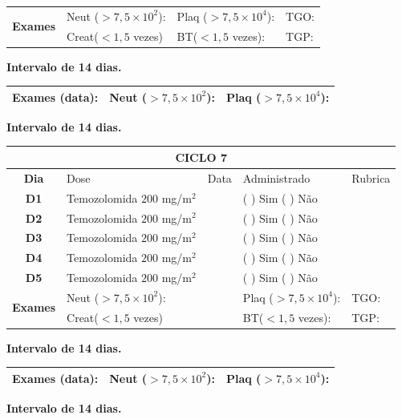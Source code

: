 \documentclass[11pt,a4paper,oldfontcommands]{memoir}
\begin{document}
\begin{center}
\begin{table}[H]
\begin{tabular}{p{1cm}p{5cm}|p{1cm}|p{4.5cm}|p{2cm}}
    \hline
    \multicolumn{1}{c|}{\multirow{2}{*}{\textbf{Exames}}}&\multicolumn{2}{l|}{Neut (\(>7,5\times10^2\)):}&{Plaq (\(>7,5\times10^4\)):}&{TGO:}\\
    \cline{2-5}
    \multicolumn{1}{c|}{\multirow{2}{*}{{}}}&\multicolumn{2}{l|}{Creat(\(<1,5\) vezes)}&{BT(\(<1,5\) vezes):}&{TGP:}
    \\
    \hline
\end{tabular}
\end{table}
\textbf{Intervalo de 14 dias.}
\begin{table}[H]
\begin{tabular}{p{5cm}|p{5cm}|p{4.7cm}}
    \hline
    \textbf{Exames (data):}&{Neut (\(>7,5\times10^2\)):}&{Plaq (\(>7,5\times10^4\)):}
    \\
    \hline
\end{tabular}
\end{table}
\textbf{Intervalo de 14 dias.}
\begin{table}[H]
\begin{tabular}{p{1cm}p{5cm}|p{1cm}|p{4.5cm}|p{2cm}}
	\hline
	\multicolumn{5}{c}{\textbf{CICLO 7}}\\
\hline
    \multicolumn{1}{c|}{\multirow{1}{*}{\textbf{Dia}}}&{Dose}&{Data}&{Administrado}&{Rubrica} \\
    \hline
    \multicolumn{1}{c|}{\multirow{1}{*}{\textbf{D1}}}&{Temozolomida \(200\) mg/m\(^2\)}&&{(  ) Sim (  ) Não}&\\
    \multicolumn{1}{c|}{\multirow{1}{*}{\textbf{D2}}}&{Temozolomida \(200\) mg/m\(^2\)}&&{(  ) Sim (  ) Não}&\\
    \multicolumn{1}{c|}{\multirow{1}{*}{\textbf{D3}}}&{Temozolomida \(200\) mg/m\(^2\)}&&{(  ) Sim (  ) Não}&\\
    \multicolumn{1}{c|}{\multirow{1}{*}{\textbf{D4}}}&{Temozolomida \(200\) mg/m\(^2\)}&&{(  ) Sim (  ) Não}&\\
    \multicolumn{1}{c|}{\multirow{1}{*}{\textbf{D5}}}&{Temozolomida \(200\) mg/m\(^2\)}&&{(  ) Sim (  ) Não}&\\
    \hline
    \multicolumn{1}{c|}{\multirow{2}{*}{\textbf{Exames}}}&\multicolumn{2}{l|}{Neut (\(>7,5\times10^2\)):}&{Plaq (\(>7,5\times10^4\)):}&{TGO:}\\
    \cline{2-5}
    \multicolumn{1}{c|}{\multirow{2}{*}{{}}}&\multicolumn{2}{l|}{Creat(\(<1,5\) vezes)}&{BT(\(<1,5\) vezes):}&{TGP:}
    \\
    \hline
\end{tabular}
\end{table}
\textbf{Intervalo de 14 dias.}
\begin{table}[H]
\begin{tabular}{p{5cm}|p{5cm}|p{4.7cm}}
    \hline
    \textbf{Exames (data):}&{Neut (\(>7,5\times10^2\)):}&{Plaq (\(>7,5\times10^4\)):}
    \\
    \hline
\end{tabular}
\end{table}
\textbf{Intervalo de 14 dias.}


\end{center}
\end{document}
